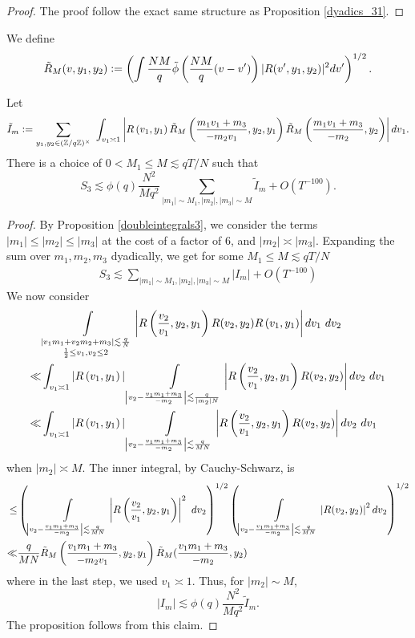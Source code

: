 \begin{proof}
    The proof follow the exact same structure as Proposition \ref{dyadics_31}.
\end{proof}
\iffalse
We define \[
\tilde{R}_M(v,y_1,y_2) \mathrel{\mathop:}= \left( \int \frac{NM}{q}\tilde{\phi}\left(\frac{NM}{q}(v-v')\right)|R(v',y_1,y_2)|^2 dv'\right)^{1/2}.
\]
\begin{proposition} \label{dyadics_3}
    Let \[
    \tilde{I}_m\mathrel{\mathop:}= \sum_{y_1,y_2\in (\mathbb{Z}/q\mathbb{Z})^\times}\ \int_{v_1\asymp 1} 
         \left|R\left(v_1,y_1\right) \tilde{R}_M\left(\frac{m_1v_1+m_3}{-m_2v_1},y_2,y_1\right)
        \tilde{R}_M\left(\frac{m_1v_1+m_3}{-m_2},y_2\right)\right| dv_1.
    \]
    There is a choice of $0<M_1\leq M \lesssim qT/N$ such that \[
        S_3\lesssim \phi(q)\frac{N^2}{Mq^2}\sum_{|m_1|\sim M_1,|m_2|,|m_3|\sim M}\tilde{I}_m+O(T^{-100}).
    \]
\end{proposition}


\begin{proof}
By Proposition \ref{doubleintegrals3}, we consider the terms $|m_1|\leq |m_2|\leq|m_3|$ at the cost of a factor of $6$, and $|m_2|\asymp|m_3|$. Expanding the sum over $m_1,m_2,m_3$ dyadically, we get for some $M_1\leq M \lesssim qT/N $ \begin{align*}
    S_3\lesssim \sum_{|m_1|\sim M_1,|m_2|,|m_3|\sim M}|I_m| + O(T^{-100})
\end{align*}
We now consider
\begin{align*} 
   & \int\displaylimits_{\substack{
        |v_1m_1+v_2m_2+m_3|\lesssim \frac{q}{N}\\
        \frac{1}{2}\leq v_1,v_2\leq 2
    }} \left| R\left(\frac{v_2}{v_1},y_2,y_1\right)
    R(v_2,y_2)R\left(v_1,y_1\right)\right| dv_1 \ dv_2\\
     \ll& 
    \int_{v_1\asymp 1} |R\left(v_1,y_1\right)|
    \int\displaylimits_{\left|v_2 - \frac{v_1m_1+m_3}{-m_2}\right|\lesssim \frac{q}{|m_2|N}} \left| R\left(\frac{v_2}{v_1},y_2,y_1\right)
    R(v_2,y_2)\right|  dv_2 \ dv_1\\
    \ll& \int_{v_1\asymp 1} |R\left(v_1,y_1\right)|
    \int\displaylimits_{\left|v_2 - \frac{v_1m_1+m_3}{-m_2}\right|\lesssim \frac{q}{MN}} \left| R\left(\frac{v_2}{v_1},y_2,y_1\right)
    R(v_2,y_2)\right|  dv_2 \ dv_1\\
\end{align*}
when $|m_2|\asymp M$. The inner integral, by Cauchy-Schwarz,
is \begin{align*}
    \leq & \left(\int\displaylimits_{\left|v_2 - \frac{v_1m_1+m_3}{-m_2}\right|\lesssim \frac{q}{MN}} \left| R\left(\frac{v_2}{v_1},y_2,y_1\right)\right|^2 \ dv_2 \right)^{1/2}
    \left(
    \int\displaylimits_{\left|v_2 - \frac{v_1m_1+m_3}{-m_2}\right|\lesssim \frac{q}{MN}} \left|
    R(v_2,y_2)\right|^2  dv_2\right)^{1/2}\\
    \ll& \frac{q}{MN} \tilde{R}_M\left(\frac{v_1m_1+m_3}{-m_2v_1},y_2,y_1\right)  \tilde{R}_M(\frac{v_1m_1+m_3}{-m_2},y_2)
\end{align*}
where in the last step, we used $v_1\asymp 1$.
Thus, for $|m_2|\sim M$,
\[
|I_m|\lesssim \phi(q)\frac{N^2}{Mq^2}\tilde{I}_m.
\]
The proposition follows from this claim.
\end{proof}

